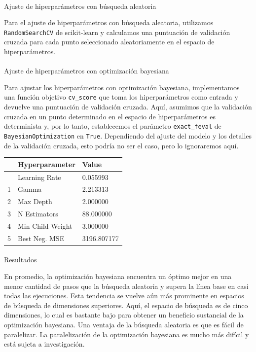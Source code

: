 \documentclass[
  12pt,
  letterpaper,
  DIV=11,
  numbers=noendperiod]{scrartcl}
\makeatletter
\let\oldparagraph\paragraph
\renewcommand{\paragraph}{
    \@ifstar
      \xxxParagraphStar
      \xxxParagraphNoStar
  }
\newcommand{\xxxParagraphStar}[1]{\oldparagraph*{#1}\mbox{}}
\newcommand{\xxxParagraphNoStar}[1]{\oldparagraph{#1}\mbox{}}
\makeatother
\begin{document}
\paragraph{Ajuste de hiperparámetros con búsqueda
aleatoria}\label{ajuste-de-hiperparuxe1metros-con-buxfasqueda-aleatoria}

Para el ajuste de hiperparámetros con búsqueda aleatoria, utilizamos
\texttt{RandomSearchCV} de scikit-learn y calculamos una puntuación de
validación cruzada para cada punto seleccionado aleatoriamente en el
espacio de hiperparámetros.

\paragraph{Ajuste de hiperparámetros con optimización
bayesiana}\label{ajuste-de-hiperparuxe1metros-con-optimizaciuxf3n-bayesiana}

Para ajustar los hiperparámetros con optimización bayesiana,
implementamos una función objetivo \texttt{cv\_score} que toma los
hiperparámetros como entrada y devuelve una puntuación de validación
cruzada. Aquí, asumimos que la validación cruzada en un punto
determinado en el espacio de hiperparámetros es determinista y, por lo
tanto, establecemos el parámetro \texttt{exact\_feval} de
\texttt{BayesianOptimization} en \texttt{True}. Dependiendo del ajuste
del modelo y los detalles de la validación cruzada, esto podría no ser
el caso, pero lo ignoraremos aquí.

\begin{longtable}[]{@{}lll@{}}
\toprule\noalign{}
& Hyperparameter & Value \\
\midrule\noalign{}
\endhead
\bottomrule\noalign{}
\endlastfoot
0 & Learning Rate & 0.055993 \\
1 & Gamma & 2.213313 \\
2 & Max Depth & 2.000000 \\
3 & N Estimators & 88.000000 \\
4 & Min Child Weight & 3.000000 \\
5 & Best Neg. MSE & 3196.807177 \\
\end{longtable}

\paragraph{Resultados}\label{resultados}

En promedio, la optimización bayesiana encuentra un óptimo mejor en una
menor cantidad de pasos que la búsqueda aleatoria y supera la línea base
en casi todas las ejecuciones. Esta tendencia se vuelve aún más
prominente en espacios de búsqueda de dimensiones superiores. Aquí, el
espacio de búsqueda es de cinco dimensiones, lo cual es bastante bajo
para obtener un beneficio sustancial de la optimización bayesiana. Una
ventaja de la búsqueda aleatoria es que es fácil de paralelizar. La
paralelización de la optimización bayesiana es mucho más difícil y está
sujeta a investigación.
\end{document}
